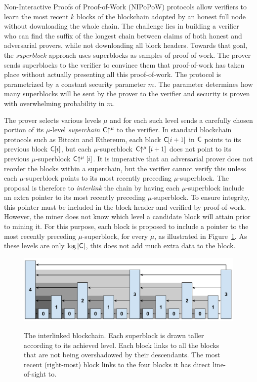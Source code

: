 Non-Interactive Proofs of Proof-of-Work (NIPoPoW) protocols allow verifiers to
learn the most recent $k$ blocks of the blockchain adopted by an honest full
node without downloading the whole chain. The challenge lies in building a
verifier who can find the suffix of the longest chain between claims of both
honest and adversarial provers, while not downloading all block headers. Towards
that goal, the \emph{superblock} approach uses superblocks as samples of
proof-of-work. The prover sends superblocks to the verifier to convince them
that proof-of-work has taken place without actually presenting all this
proof-of-work. The protocol is parametrized by a constant security parameter
$m$. The parameter determines how many superblocks will be sent by the prover to
the verifier and security is proven with overwhelming probability in $m$.

The prover selects various levels $\mu$ and for each such level sends a
carefully chosen portion of its $\mu$-level \emph{superchain}
$\mathsf{C}\negthickspace\uparrow^\mu$ to the verifier. In standard blockchain protocols such as
Bitcoin and Ethereum, each block $\mathsf{C}[i + 1]$ in $\mathsf{C}$ points to its
previous block $\mathsf{C}[i]$, but each $\mu$-superblock $\mathsf{C}\negthickspace\uparrow^\mu[i +
1]$ does not point to its previous $\mu$-superblock $\mathsf{C}\negthickspace\uparrow^\mu[i]$. It
is imperative that an adversarial prover does not reorder the blocks within a
superchain, but the verifier cannot verify this unless each $\mu$-superblock
points to its most recently preceding $\mu$-superblock. The proposal is
therefore to \emph{interlink} the chain by having each $\mu$-superblock include
an extra pointer to its most recently preceding $\mu$-superblock. To ensure
integrity, this pointer must be included in the block header and verified by
proof-of-work. However, the miner does not know which level a candidate block
will attain prior to mining it. For this purpose, each block is proposed to
include a pointer to the most recently preceding $\mu$-superblock, for every
$\mu$, as illustrated in Figure~\ref{fig.hierarchy}. As these levels are only
$\log|\mathsf{C}|$, this does not add much extra data to the block.

\begin{figure}[ht]
    \caption{The interlinked blockchain. Each superblock is drawn taller
    according to its achieved level. Each block links to all the blocks that are
    not being overshadowed by their descendants. The most recent (right-most)
    block links to the four blocks it has direct line-of-sight to.}
    \centering
    \includegraphics[width=0.9\columnwidth,keepaspectratio]{figures/level-shadows.pdf}
    \label{fig.hierarchy}
\end{figure}

